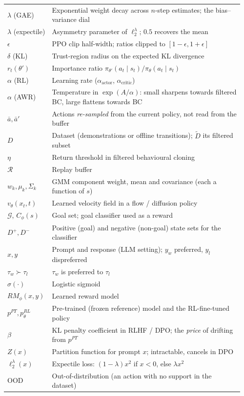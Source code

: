 \documentclass[11pt,a4paper]{article}
\begin{document}
\begin{center}
\begin{tabular}{@{}p{0.16\linewidth}p{0.80\linewidth}@{}}
$\lambda$ (GAE) & Exponential weight decay across $n$-step estimates; the bias--variance dial \\
$\lambda$ (expectile) & Asymmetry parameter of $\ell_2^\lambda$; $0.5$ recovers the mean \\
$\epsilon$ & PPO clip half-width; ratios clipped to $[1-\epsilon,1+\epsilon]$ \\
$\delta$ (KL) & Trust-region radius on the expected KL divergence \\
$r_t(\theta')$ & Importance ratio $\pi_{\theta'}(a_t\mid s_t)/\pi_\theta(a_t\mid s_t)$ \\
$\alpha$ (RL) & Learning rate ($\alpha_{\text{actor}}$, $\alpha_{\text{critic}}$) \\
$\alpha$ (AWR) & Temperature in $\exp(A/\alpha)$: small sharpens towards filtered BC, large flattens towards BC \\
$\bar a,\bar a'$ & Actions \emph{re-sampled} from the current policy, not read from the buffer \\
$D$ & Dataset (demonstrations or offline transitions); $\tilde D$ its filtered subset \\
$\eta$ & Return threshold in filtered behavioural cloning \\
$\mathcal R$ & Replay buffer \\
$w_k,\mu_k,\Sigma_k$ & GMM component weight, mean and covariance (each a function of $s$) \\
$v_\theta(x_t,t)$ & Learned velocity field in a flow / diffusion policy \\
$\mathcal G$, $C_\phi(s)$ & Goal set; goal classifier used as a reward \\
$D^+,D^-$ & Positive (goal) and negative (non-goal) state sets for the classifier \\
$x,y$ & Prompt and response (LLM setting); $y_w$ preferred, $y_l$ dispreferred \\
$\tau_w \succ \tau_l$ & $\tau_w$ is preferred to $\tau_l$ \\
$\sigma(\cdot)$ & Logistic sigmoid \\
$RM_\phi(x,y)$ & Learned reward model \\
$p^{PT},p^{RL}_\theta$ & Pre-trained (frozen reference) model and the RL-fine-tuned policy \\
$\beta$ & KL penalty coefficient in RLHF / DPO; the \emph{price} of drifting from $p^{PT}$ \\
$Z(x)$ & Partition function for prompt $x$; intractable, cancels in DPO \\
$\ell_2^\lambda(x)$ & Expectile loss: $(1-\lambda)x^2$ if $x<0$, else $\lambda x^2$ \\
OOD & Out-of-distribution (an action with no support in the dataset) \\
\bottomrule
\end{tabular}
\end{center}
\end{document}
